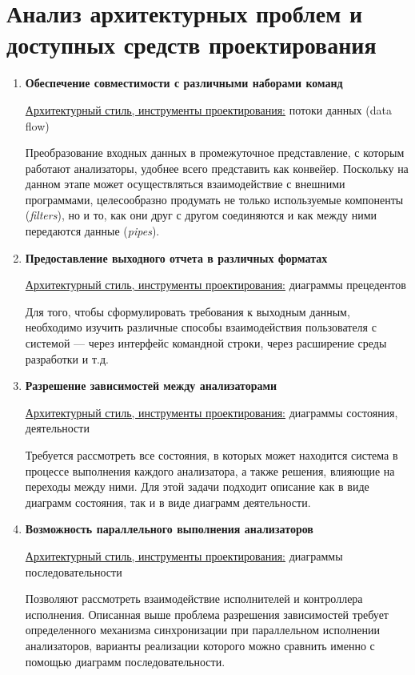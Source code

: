 \documentclass[listings]{labreport}
\begin{document}
\maketitlepage

\section*{Анализ архитектурных проблем и доступных средств проектирования}

\begin{enumerate}
\item \textbf{Обеспечение совместимости с различными наборами команд}

\uline{Архитектурный стиль, инструменты проектирования:} потоки данных (data flow)

Преобразование входных данных в промежуточное представление, с которым работают
анализаторы, удобнее всего представить как конвейер. Поскольку на данном этапе
может осуществляться взаимодействие с внешними программами, целесообразно продумать
не только используемые компоненты (\textit{filters}), но и то, как они друг с другом
соединяются и как между ними передаются данные (\textit{pipes}).

\item \textbf{Предоставление выходного отчета в различных форматах}

\uline{Архитектурный стиль, инструменты проектирования:} диаграммы прецедентов

Для того, чтобы сформулировать требования к выходным данным, необходимо
изучить различные способы взаимодействия пользователя с системой —
через интерфейс командной строки, через расширение среды разработки и т.д.

\item \textbf{Разрешение зависимостей между анализаторами}

\uline{Архитектурный стиль, инструменты проектирования:} диаграммы состояния, деятельности

Требуется рассмотреть все состояния, в которых может находится система в процессе
выполнения каждого анализатора, а также решения, влияющие на переходы между ними.
Для этой задачи подходит описание как в виде диаграмм состояния,
так и в виде диаграмм деятельности.

\item \textbf{Возможность параллельного выполнения анализаторов}

\uline{Архитектурный стиль, инструменты проектирования:} диаграммы последовательности

Позволяют рассмотреть взаимодействие исполнителей и контроллера исполнения.
Описанная выше проблема разрешения зависимостей требует определенного
механизма синхронизации при параллельном исполнении анализаторов,
варианты реализации которого можно сравнить именно с помощью
диаграмм последовательности.


\end{enumerate}
\end{document}
